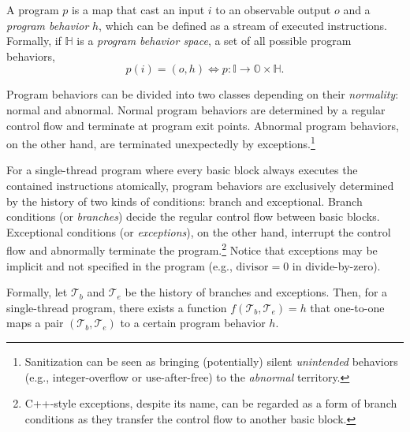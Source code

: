 \documentclass[letterpaper,twocolumn,10pt]{article}
\begin{document}
A program $p$ is a map that cast an input $i$ to an observable output $o$ and
a \emph{program behavior} $h$, which can be defined as a stream of executed
instructions. Formally, if $\mathbb{H}$ is a \emph{program behavior space}, 
a set of all possible program behaviors,
%
\begin{equation}
  p(i) = (o, h) \iff p: \mathbb{I} \rightarrow \mathbb{O} \times \mathbb{H}.
\end{equation}

%
Program behaviors can be divided into two classes depending on their
\emph{normality}: normal and abnormal. Normal program behaviors are determined
by a regular control flow and terminate at program exit points.  Abnormal
program behaviors, on the other hand, are terminated unexpectedly by
exceptions.\footnote{Sanitization can be seen as bringing (potentially) silent
\emph{unintended} behaviors (e.g., integer-overflow or use-after-free) to the
\emph{abnormal} territory.}

%
For a single-thread program where every basic block always executes the
contained instructions atomically, program behaviors are exclusively
determined by the history of two kinds of conditions: branch and exceptional.
Branch conditions (or \emph{branches}) decide the regular control flow between
basic blocks. Exceptional conditions (or \emph{exceptions}), on the other hand,
interrupt the control flow and abnormally terminate the
program.\footnote{C++-style exceptions, despite its name, can be regarded as a
form of branch conditions as they transfer the control flow to another basic
block.} Notice that exceptions may be implicit and not specified in the
program (e.g., $\mathrm{divisor}=0$ in divide-by-zero).


Formally, let $\mathcal{T}_b$ and $\mathcal{T}_e$ be the history of branches and
exceptions. Then, for a single-thread program, there exists a function
$f(\mathcal{T}_b, \mathcal{T}_e) = h$ that one-to-one maps a pair
$(\mathcal{T}_b, \mathcal{T}_e)$ to a certain program behavior $h$.
%
\end{document}
